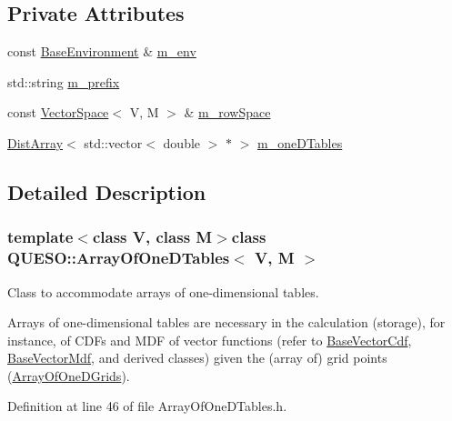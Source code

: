 \subsection*{Private Attributes}
\begin{DoxyCompactItemize}
\item 
const \hyperlink{class_q_u_e_s_o_1_1_base_environment}{Base\-Environment} \& \hyperlink{class_q_u_e_s_o_1_1_array_of_one_d_tables_a51d23742e1c418efc4e829cb06fcda76}{m\-\_\-env}
\item 
std\-::string \hyperlink{class_q_u_e_s_o_1_1_array_of_one_d_tables_ae9bfd81e226ee5712cd160031f96d4d2}{m\-\_\-prefix}
\item 
const \hyperlink{class_q_u_e_s_o_1_1_vector_space}{Vector\-Space}$<$ V, M $>$ \& \hyperlink{class_q_u_e_s_o_1_1_array_of_one_d_tables_a476632866ae0eebc389f19b8b83cc324}{m\-\_\-row\-Space}
\item 
\hyperlink{class_q_u_e_s_o_1_1_dist_array}{Dist\-Array}$<$ std\-::vector$<$ double $>$ $\ast$ $>$ \hyperlink{class_q_u_e_s_o_1_1_array_of_one_d_tables_ad5e13befcb2e58dde1c13e396388a696}{m\-\_\-one\-D\-Tables}
\end{DoxyCompactItemize}


\subsection{Detailed Description}
\subsubsection*{template$<$class V, class M$>$class Q\-U\-E\-S\-O\-::\-Array\-Of\-One\-D\-Tables$<$ V, M $>$}

Class to accommodate arrays of one-\/dimensional tables. 

Arrays of one-\/dimensional tables are necessary in the calculation (storage), for instance, of C\-D\-Fs and M\-D\-F of vector functions (refer to \hyperlink{class_q_u_e_s_o_1_1_base_vector_cdf}{Base\-Vector\-Cdf}, \hyperlink{class_q_u_e_s_o_1_1_base_vector_mdf}{Base\-Vector\-Mdf}, and derived classes) given the (array of) grid points (\hyperlink{class_q_u_e_s_o_1_1_array_of_one_d_grids}{Array\-Of\-One\-D\-Grids}). 

Definition at line 46 of file Array\-Of\-One\-D\-Tables.\-h.



